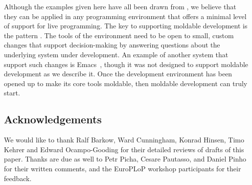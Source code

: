 \documentclass[acmsmall,screen,authorversion,nonacm]{acmart} %
\newcommand{\GT}{\lst{GT}\xspace} %
\newcommand{\patref}[1]{\emph{\nameref{pat:#1}}\xspace}
\begin{document}
Although the examples given here have all been drawn from \GT, we believe that they can be applied in any programming environment that offers a minimal level of support for live programming.
The key to supporting moldable development is the pattern \patref{MoldableTool}.
The tools of the environment need to be open to small, custom changes that support decision-making by answering questions about the underlying system under development.
An example of another system that support such changes is Emacs~\cite{Stal81a}, though it was not designed to support moldable development as we describe it.
Once the development environment has been opened up to make its core tools moldable, then moldable development can truly start.

\subsection*{Acknowledgements}
We would like to thank Ralf Barkow, Ward Cunningham, Konrad Hinsen, Timo Kehrer and Edward Ocampo-Gooding for their detailed reviews of drafts of this paper.
Thanks are due as well to Petr Picha, Cesare Pautasso, and Daniel Pinho for their written comments, and the EuroPLoP workshop participants for their feedback.



\end{document}
